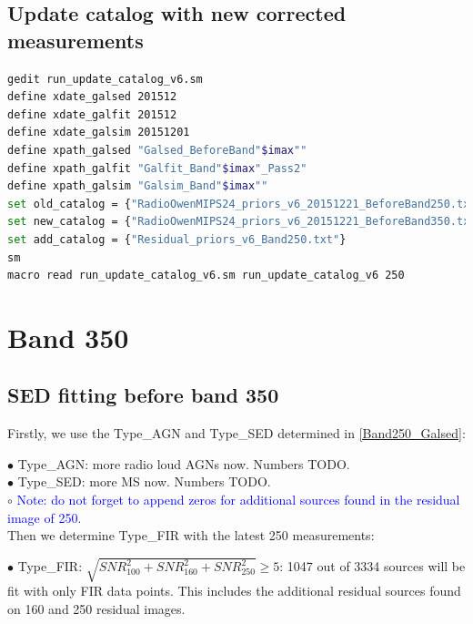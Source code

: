 \documentclass[11pt,a4paper]{article}
\begin{document}
\subsection{Update catalog with new corrected measurements}

\begin{lstlisting}[language=bash]
gedit run_update_catalog_v6.sm
define xdate_galsed 201512
define xdate_galfit 201512
define xdate_galsim 20151201
define xpath_galsed "Galsed_BeforeBand"$imax""
define xpath_galfit "Galfit_Band"$imax"_Pass2"
define xpath_galsim "Galsim_Band"$imax""
set old_catalog = {"RadioOwenMIPS24_priors_v6_20151221_BeforeBand250.txt"}
set new_catalog = {"RadioOwenMIPS24_priors_v6_20151221_BeforeBand350.txt"}
set add_catalog = {"Residual_priors_v6_Band250.txt"}
sm
macro read run_update_catalog_v6.sm run_update_catalog_v6 250
\end{lstlisting}


\clearpage

\section{Band 350}

\subsection{SED fitting before band 350}
\label{Band350_Galsed}

Firstly, we use the Type\_AGN and Type\_SED determined in \ref{Band250_Galsed}:

\indent\hspace{15pt}$\bullet$ 
Type\_AGN: more radio loud AGNs now. Numbers TODO. 
\\
\indent\hspace{15pt}$\bullet$ 
Type\_SED: more MS now. Numbers TODO. 
\\
\indent\hspace{15pt}$\circ$ 
\textcolor{blue}{Note: \textcolor{blue}{do not forget} to append zeros for additional sources found in the residual image of 250.}
\\

Then we determine Type\_FIR with the latest 250 measurements:

\indent\hspace{15pt}$\bullet$ 
Type\_FIR: $\sqrt{SNR_{100}^2+SNR_{160}^2+SNR_{250}^2} \ge 5$: 1047 out of 3334 sources will be fit with only FIR data points. This includes the additional residual sources found on 160 and 250 residual images. 
\\
\end{document}
